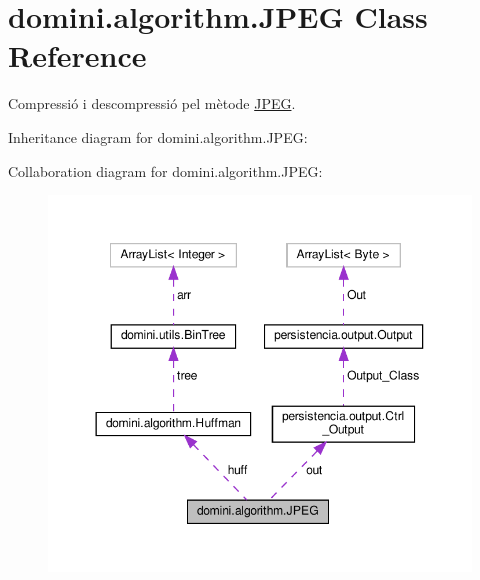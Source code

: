 \hypertarget{classdomini_1_1algorithm_1_1JPEG}{}\section{domini.\+algorithm.\+J\+P\+EG Class Reference}
\label{classdomini_1_1algorithm_1_1JPEG}


Compressió i descompressió pel mètode \hyperlink{classdomini_1_1algorithm_1_1JPEG}{J\+P\+EG}.  




Inheritance diagram for domini.\+algorithm.\+J\+P\+EG\+:


Collaboration diagram for domini.\+algorithm.\+J\+P\+EG\+:\nopagebreak
\begin{figure}[H]
\begin{center}
\leavevmode
\includegraphics[width=350pt]{classdomini_1_1algorithm_1_1JPEG__coll__graph}
\end{center}
\end{figure}
